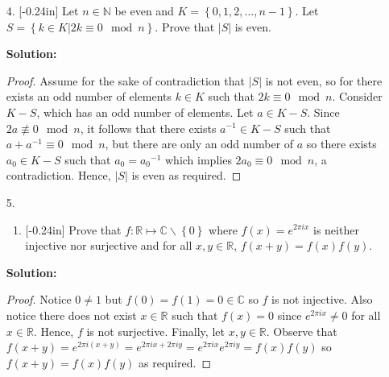 \documentclass[letterpaper,12pt]{article}
\newcommand{\set}[1]{\left\{ #1 \right\}}
\theoremstyle{definition}
\begin{document}
\pagebreak
\begin{enumerate}
    \item[4.]\reversemarginpar{}[-0.24in] Let $n \in \mathbb{N}$ be even and $K = \set{0,1,2,\ldots,n-1}$. Let $S = \set{k \in K  | 2k \equiv 0 \mod n }$. Prove that $|S|$ is even.
     \begin{mdframed}
            \textbf{Solution:}
            \begin{proof}
                Assume for the sake of contradiction that $|S|$ is not even, so for there exists an odd number of elements $k \in K$ such that $2k \equiv 0 \mod n$. Consider $K-S$, which has an odd number of elements. Let $a \in K-S$. Since $2a \not \equiv 0 \mod n$, it follows that there exists $a^{-1} \in K-S$ such that $a + a^{-1} \equiv 0 \mod n$, but there are only an odd number of $a$ so there exists $a_0 \in K-S $ such that $a_0 = {a_0}^{-1}$ which implies $2a_0 \equiv 0 \mod n$, a contradiction. Hence, $|S|$ is even as required.
            \end{proof}
        \end{mdframed}
\end{enumerate}
\pagebreak
\begin{enumerate}
    \item[5.] \begin{enumerate} \item \reversemarginpar{}[-0.24in] Prove that $f: \mathbb{R} \mapsto \mathbb{C}\backslash \set{0}$ where $f(x) = e^{2\pi i x}$ is neither injective nor surjective and for all $x,y \in \mathbb{R}$, $f(x+y) = f(x)f(y)$. \end{enumerate}
     \begin{mdframed}
            \textbf{Solution:}
            \begin{proof}
                Notice $0 \neq 1$ but $f(0) = f(1) = 0 \in \mathbb{C}$ so $f$ is not injective. Also notice there does not exist $x \in \mathbb{R}$ such that $f(x) = 0$ since $e^{2\pi i x} \neq 0$ for all $x \in \mathbb{R}$. Hence, $f$ is not surjective. Finally, let $x,y \in \mathbb{R}$. Observe that $f(x+y) = e^{2\pi i (x+y)} = e^{2\pi i x + 2\pi i y} = e^{2\pi i x} e^{2\pi i y} = f(x)f(y)$ so $f(x+y) = f(x)f(y)$ as required.
            \end{proof}
        \end{mdframed}
\end{enumerate}
\pagebreak
\end{document}
